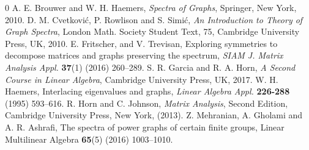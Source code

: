 \documentclass[12pt,twoside]{article}
\begin{document}
\begin{thebibliography}{0}
 A. E. Brouwer and W. H. Haemers, \textit{Spectra of Graphs}, Springer, New York, 2010.
 D. M. Cvetkovi\'{c}, P. Rowlison and S. Simi\'c, \textit{An Introduction to Theory of Graph Spectra}, London Math. Society Student Text, 75, Cambridge University Press, UK, 2010.
 E. Fritscher, and V. Trevisan, Exploring symmetries to decompose matrices and graphs preserving the spectrum, \textit{SIAM J. Matrix Analysis  Appl.} \textbf{37}(1) (2016) 260--289.
 S. R. Garcia and R. A. Horn, \emph{A Second Course in Linear Algebra}, Cambridge University Press, UK, 2017.
 W. H. Haemers, Interlacing eigenvalues and graphs, \textit{Linear Algebra Appl.} {\bf 226-288} (1995) 593--616.
 R. Horn and C. Johnson,  \textit{Matrix Analysis}, Second Edition, Cambridge University Press, New York, (2013).
 Z. Mehranian, A. Gholami and A. R. Ashrafi, The spectra of power graphs of certain finite groups,  Linear Multilinear Algebra  {\bf 65}(5) (2016) 1003--1010.


\end{thebibliography}
\end{document}
